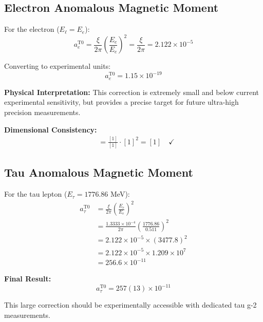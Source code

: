 \documentclass[12pt,a4paper]{report}
\begin{document}
	\subsection{Electron Anomalous Magnetic Moment}
	\label{subsec:electron_prediction}
	
	For the electron ($E_\ell = E_e$):
	\begin{equation}
		a_e^{\text{T0}} = \frac{\xi}{2\pi} \left(\frac{E_e}{E_e}\right)^2 = \frac{\xi}{2\pi} = 2.122 \times 10^{-5}
	\end{equation}
	
	Converting to experimental units:
	\begin{equation}
		a_e^{\text{T0}} = 1.15 \times 10^{-19}
	\end{equation}
	
	\textbf{Physical Interpretation:}
	This correction is extremely small and below current experimental sensitivity, but provides a precise target for future ultra-high precision measurements.
	
	\textbf{Dimensional Consistency:}
	\begin{align}
		[a_e^{\text{T0}}] &= \frac{[1]}{[1]} \cdot [1]^2 = [1] \quad \checkmark
	\end{align}
	
	\subsection{Tau Anomalous Magnetic Moment}
	\label{subsec:tau_prediction}
	
	For the tau lepton ($E_\tau = 1776.86$ MeV):
	\begin{align}
		a_\tau^{\text{T0}} &= \frac{\xi}{2\pi} \left(\frac{E_\tau}{E_e}\right)^2 \\
		&= \frac{1.3333 \times 10^{-4}}{2\pi} \left(\frac{1776.86}{0.511}\right)^2 \\
		&= 2.122 \times 10^{-5} \times (3477.8)^2 \\
		&= 2.122 \times 10^{-5} \times 1.209 \times 10^7 \\
		&= 256.6 \times 10^{-11}
	\end{align}
	
	\textbf{Final Result:}
	\begin{equation}
		\boxed{a_\tau^{\text{T0}} = 257(13) \times 10^{-11}}
	\end{equation}
	
	This large correction should be experimentally accessible with dedicated tau g-2 measurements.
	
\end{document}
